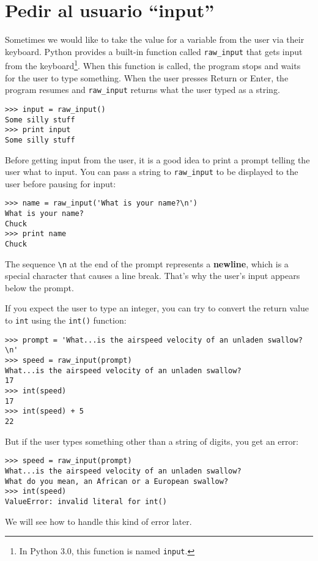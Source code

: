 \section{Pedir al usuario ``input''}

Sometimes we would like to take the value for a variable from the user
via their keyboard.
Python provides a built-in function called \verb"raw_input" that gets
input from the keyboard\footnote{In Python 3.0, this function is named
  {\tt input}.}.  When this function is called, the program stops and
waits for the user to type something.  When the user presses {\sf
  Return} or {\sf Enter}, the program resumes and \verb"raw_input"
returns what the user typed as a string.


\beforeverb
\begin{verbatim}
>>> input = raw_input()
Some silly stuff
>>> print input
Some silly stuff
\end{verbatim}
\afterverb
%
Before getting input from the user, it is a good idea to print a
prompt telling the user what to input.  You can pass a string
to \verb"raw_input" to be displayed to the user before pausing
for input:


\beforeverb
\begin{verbatim}
>>> name = raw_input('What is your name?\n')
What is your name?
Chuck
>>> print name
Chuck
\end{verbatim}
\afterverb
%
The sequence \verb"\n" at the end of the prompt represents a {\bf newline},
which is a special character that causes a line break.
That's why the user's input appears below the prompt.


If you expect the user to type an integer, you can try to convert
the return value to {\tt int} using the {\tt int()} function:

\beforeverb
\begin{verbatim}
>>> prompt = 'What...is the airspeed velocity of an unladen swallow?\n'
>>> speed = raw_input(prompt)
What...is the airspeed velocity of an unladen swallow?
17
>>> int(speed)
17
>>> int(speed) + 5
22
\end{verbatim}
\afterverb
%
But if the user types something other than a string of digits,
you get an error:

\beforeverb
\begin{verbatim}
>>> speed = raw_input(prompt)
What...is the airspeed velocity of an unladen swallow?
What do you mean, an African or a European swallow?
>>> int(speed)
ValueError: invalid literal for int()
\end{verbatim}
\afterverb
%
We will see how to handle this kind of error later.

